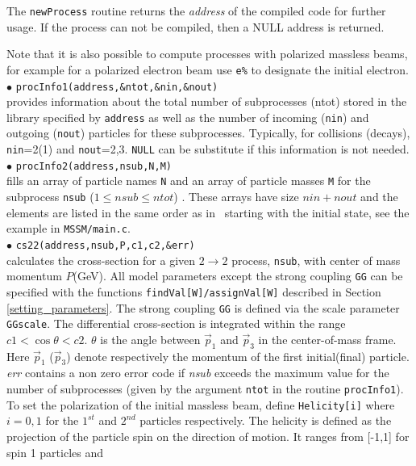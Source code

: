 \documentclass[12pt,a4paper]{article}
\begin{document}
The \verb|newProcess| routine returns the
{\it address} of the compiled code for further usage.   If the
process can not be compiled, then a NULL address is
returned. 


Note that it is also possible to compute processes with polarized massless beams, 
for example for a polarized electron beam use \verb|e%|
 to designate the initial electron.\\[2mm]
%
\noindent
$\bullet$ \verb|procInfo1(address,&ntot,&nin,&nout)|\\
provides information  about the total number of subprocesses
(ntot) stored in the library  specified by {\tt address} as well
as the number of incoming (\verb|nin|) and outgoing (\verb|nout|) particles for
these subprocesses. Typically, for collisions (decays), \verb|nin|=2(1) and \verb|nout|=2,3.
\verb|NULL| can be substitute if this information is not needed. \\[2mm]
%
$\bullet$ \verb|procInfo2(address,nsub,N,M)|\\
fills an array of
particle names \verb|N| and an array of particle  masses \verb|M| for the subprocess \verb|nsub| ($1\leq nsub \leq ntot$) . These
arrays have size $nin+nout$ and the elements are listed in the same order
as in \calchep\ starting with the initial state, see the example in 
\verb|MSSM/main.c|.\\[2mm]
%
\noindent
$\bullet$ \verb|cs22(address,nsub,P,c1,c2,&err)|\\
calculates  the cross-section for a given $2\rightarrow 2$
process, \verb|nsub|, with  center of mass momentum $P$(GeV). 
All model parameters  except the strong coupling {\tt GG}
can be specified with the functions {\tt findVal[W]/assignVal[W]}
described in Section \ref{setting_parameters}. The strong coupling {\tt GG}
is defined via the scale parameter {\tt GGscale}.    
The
differential cross-section is integrated
 within the range  $ c1 < \cos\theta <c2 $. $\theta$ is
the angle between $\vec{p}_1$ and $\vec{p}_3$  in the
center-of-mass frame. Here $\vec{p}_1$ ($\vec{p}_3$) denote
respectively the momentum of the first initial(final) particle.
{\it err} contains a non zero error code if {\it nsub} exceeds the
maximum value  for the number of subprocesses (given by the
argument \verb|ntot| in the routine {\tt procInfo1}). To set the polarization 
of the initial massless beam, define   \verb|Helicity[i]|  where $i=0,1$ 
for the $1^{st}$ and $2^{nd}$ particles respectively.
The   helicity is defined as the projection of the particle spin
on the direction of motion. It ranges from  [-1,1] for spin 1 particles and 
\end{document}
